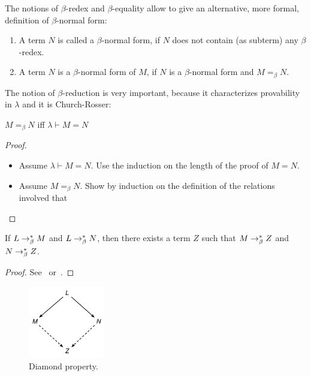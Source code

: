 The notions of $\beta$-redex and $\beta$-equality allow to give an alternative, more formal, definition of $\beta$-normal form:
\begin{definition}  
\begin{enumerate}
\item A term $N$ is called a $\beta$-normal form, if $N$ does not contain (as subterm) any $\beta$-redex.
\item A term $N$ is a $\beta$-normal form of $M$, if $N$ is a $\beta$-normal form and $M =_{\beta} N$.
\end{enumerate}
\end{definition}


The notion of $\beta$-reduction is very important, because it characterizes provability in $\lambda$ and it is Church-Rosser:

\begin{proposition} $M =_{\beta} N$ iff $\lambda \vdash M = N$
\end{proposition}
\begin{proof} %
\begin{itemize}
\item Assume $\lambda \vdash M = N$. Use the induction on the length of the proof of $M=N$.
\item Assume $M =_{\beta} N$. Show by induction on the definition of the relations involved that
\end{itemize}
\end{proof}


\begin{theorem} If $L \rightarrow^{*}_\beta M$ and $L \rightarrow^{*}_\beta N$, then there exists a term $Z$ such that $M \rightarrow^{*}_\beta Z$ and $N \rightarrow^{*}_\beta Z$.
\end{theorem}
\begin{proof} See~\cite[p.62]{Barendregt:1981:The-Lambda-Calculus:-Its-Syntax-and-Semantics} or~\cite[p.289]{HindleySeldin:2008:Lambda-Calculus-and-Combinators-an-Introduction}.
\end{proof}
\begin{figure}[h!]
  \centering
    \includegraphics[width=0.3\textwidth]{images/Diamond.pdf}
      \caption{Diamond property.} \label{fig:diamond}
\end{figure}

